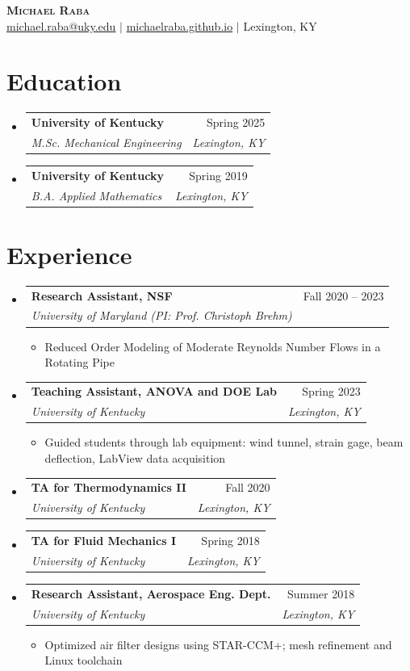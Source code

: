 \documentclass[letterpaper,11pt]{article}
\author{Michael Raba}
\date{\today}
\title{}
\makeatletter
\newcommand{\resumeItem}[1]{\item\small{{#1 \vspace{-2pt}}}}
\newcommand{\resumeSubheading}[4]{\vspace{-2pt}\item\begin{tabular*}{0.97\textwidth}[t]{l@{\extracolsep{\fill}}r}\textbf{#1} & #2 \\\textit{\small#3} & \textit{\small #4} \\\end{tabular*}\vspace{-7pt}}
\newcommand{\resumeSubHeadingListStart}{\begin{itemize}[leftmargin=0.15in, label={}]}
\newcommand{\resumeSubHeadingListEnd}{\end{itemize}}
\newcommand{\resumeItemListStart}{\begin{itemize}}
\newcommand{\resumeItemListEnd}{\end{itemize}\vspace{-5pt}}
\makeatother
\begin{document}
\begin{center}
    \textbf{\Huge \scshape Michael Raba} \\
    \href{mailto:michael.raba@uky.edu}{michael.raba@uky.edu} $|$
    \href{https://michaelraba.github.io}{michaelraba.github.io} $|$
    Lexington, KY
\end{center}

\section{Education}
  \resumeSubHeadingListStart
    \resumeSubheading
      {University of Kentucky}{Spring 2025}
      {M.Sc. Mechanical Engineering}{Lexington, KY}
    \resumeSubheading
      {University of Kentucky}{Spring 2019}
      {B.A. Applied Mathematics}{Lexington, KY}
  \resumeSubHeadingListEnd

\section{Experience}
  \resumeSubHeadingListStart
    \resumeSubheading
      {Research Assistant, NSF}{Fall 2020 -- 2023}
      {University of Maryland (PI: Prof. Christoph Brehm)}{}
      \resumeItemListStart
        \resumeItem{Reduced Order Modeling of Moderate Reynolds Number Flows in a Rotating Pipe}
      \resumeItemListEnd

    \resumeSubheading
      {Teaching Assistant, ANOVA and DOE Lab}{Spring 2023}
      {University of Kentucky}{Lexington, KY}
      \resumeItemListStart
        \resumeItem{Guided students through lab equipment: wind tunnel, strain gage, beam deflection, LabView data acquisition}
      \resumeItemListEnd

    \resumeSubheading
      {TA for Thermodynamics II}{Fall 2020}
      {University of Kentucky}{Lexington, KY}

    \resumeSubheading
      {TA for Fluid Mechanics I}{Spring 2018}
      {University of Kentucky}{Lexington, KY}

    \resumeSubheading
      {Research Assistant, Aerospace Eng. Dept.}{Summer 2018}
      {University of Kentucky}{Lexington, KY}
      \resumeItemListStart
        \resumeItem{Optimized air filter designs using STAR-CCM+; mesh refinement and Linux toolchain}
      \resumeItemListEnd
  \resumeSubHeadingListEnd
\end{document}
